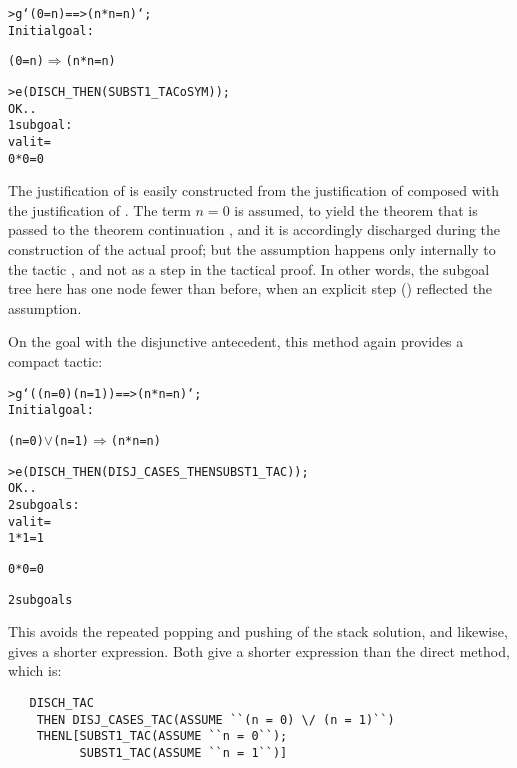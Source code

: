 \setcounter{sessioncount}{1}
\begin{session}
\begin{alltt}
> g `(0 = n) ==> (n * n = n)`;
     Initial goal:

     (0 = n) \(\Rightarrow\) (n * n = n)

> e(DISCH_THEN(SUBST1_TAC o SYM));
OK..
1 subgoal:
val it =
0 * 0 = 0
\end{alltt}
\end{session}

The justification of  is easily constructed
from the justification of  composed with the justification of
. 
The term $n=0$ is assumed, to yield the
theorem that is passed to the theorem continuation ,
and it is accordingly discharged during the construction of the
actual proof; but the assumption happens
only internally
 to the tactic , and not
as a step in the tactical proof.  In other words, the subgoal tree here
has one node fewer than before, when an explicit step ()
reflected the assumption.

On the goal with the disjunctive antecedent, this method again
provides a compact tactic:

\setcounter{sessioncount}{1}
\begin{session}
\begin{alltt}
> g `((n = 0) \/ (n = 1)) ==> (n * n = n)`;
     Initial goal:

     (n = 0) \(\lor\) (n = 1) \(\Rightarrow\) (n * n = n)

> e(DISCH_THEN(DISJ_CASES_THEN SUBST1_TAC));
OK..
2 subgoals:
val it =
1 * 1 = 1



0 * 0 = 0


2 subgoals
\end{alltt}
\end{session}

\noindent This avoids the repeated popping and pushing of the stack
solution, and likewise, gives a shorter \ML{} expression. Both give
a shorter expression than the direct method, which is:

\begin{hol}
\begin{verbatim}
   DISCH_TAC
    THEN DISJ_CASES_TAC(ASSUME ``(n = 0) \/ (n = 1)``)
    THENL[SUBST1_TAC(ASSUME ``n = 0``);
          SUBST1_TAC(ASSUME ``n = 1``)]
\end{verbatim}
\end{hol}

